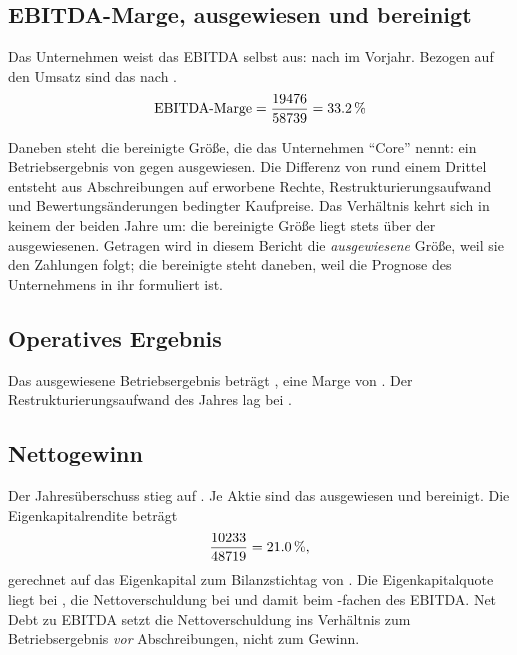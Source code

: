\subsection{EBITDA-Marge, ausgewiesen und bereinigt}

Das Unternehmen weist das EBITDA selbst aus: \MioUSD{\AznEbitda} nach
\MioUSD{\AznEbitdaVJ} im Vorjahr.
Bezogen auf den Umsatz sind das \Pct{\AznEbitdaMarge} nach
\Pct{\AznEbitdaMargeVJ}.
\[
  \text{EBITDA-Marge} = \frac{\AznEbitda}{\AznUmsatzXXV} = \Pct{\AznEbitdaMarge}
\]

Daneben steht die bereinigte Gr\"o{\ss}e, die das Unternehmen \enquote{Core}
nennt: ein Betriebsergebnis von \MioUSD{\AznCoreBetriebsergebnis} gegen
\MioUSD{\AznBetriebsergebnisXXV} ausgewiesen.
Die Differenz von rund einem Drittel entsteht aus Abschreibungen auf erworbene
Rechte, Restrukturierungsaufwand und Bewertungs\"anderungen bedingter
Kaufpreise. Das Verh\"altnis kehrt sich in keinem der beiden Jahre um: die
bereinigte Gr\"o{\ss}e liegt stets \"uber der ausgewiesenen. Getragen wird in
diesem Bericht die \emph{ausgewiesene} Gr\"o{\ss}e, weil sie den Zahlungen
folgt; die bereinigte steht daneben, weil die Prognose des Unternehmens in ihr
formuliert ist.

\subsection{Operatives Ergebnis}

Das ausgewiesene Betriebsergebnis betr\"agt \MioUSD{\AznBetriebsergebnisXXV},
eine Marge von \Pct{\AznBetriebsMarge}.
Der Restrukturierungsaufwand des Jahres lag bei
\MioUSD{\AznRestrukturierung}.

\subsection{Nettogewinn}

Der Jahres\"uberschuss stieg \Pct{\AznErgebnisWachstum} auf
\MioUSD{\AznJahresueberschussXXV}.
Je Aktie sind das \USDje{\AznErgebnisJeAktieXXV} ausgewiesen und
\USDje{\AznCoreErgebnisJeAktie} bereinigt.
Die Eigenkapitalrendite betr\"agt
\[
  \frac{\AznJahresueberschussXXV}{\AznEigenkapital} = \Pct{\AznEigenkapitalrendite},
\]
gerechnet auf das Eigenkapital zum Bilanzstichtag von
\MioUSD{\AznEigenkapital}.
Die Eigenkapitalquote liegt bei \Pct{\AznEigenkapitalquote}, die
Nettoverschuldung bei \MioUSD{\AznNettoverschuldung} und damit beim
\Faktor{\AznVerschuldungsgrad}-fachen des EBITDA.
Net Debt zu EBITDA setzt die Nettoverschuldung ins Verh\"altnis zum
Betriebsergebnis \emph{vor} Abschreibungen, nicht zum Gewinn.

